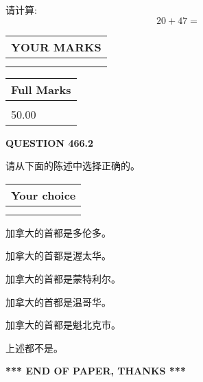 \documentclass{ctexart}
\begin{document}
  
 
请计算:
\begin{equation}
20 +  %
47 = \nonumber
\end{equation}
 

 

 
  
\vspace{0.2in}
  
\noindent\begin{tabular}{|l|}
\hline
 YOUR MARKS  \\
\hline
 \\ 
 \\ 
\hline
\end{tabular}
\hspace{0.05in} \begin{tabular}{|l|}
\hline
 Full Marks  \\
\hline
 \\ 
50.00 \\
\hline
\end{tabular}
{\textbf{\Large{QUESTION
466.2 
}}}
  
  
请从下面的陈述中选择正确的。
  
  
\noindent\hspace{3.0in} \begin{tabular}{|l|}
\hline
Your choice \\
\hline
 \\ 
 \\ 
\hline
\end{tabular}
  
  
 
 
加拿大的首都是多伦多。
 
 
加拿大的首都是渥太华。
 
 
加拿大的首都是蒙特利尔。
 
 
加拿大的首都是温哥华。
 
 
加拿大的首都是魁北克市。
 
 
 上述都不是。
 
 
   
   
 \vspace{0.2in}
 
   
   
   
   
\vspace{1.0in} 
{\textbf{\large{ *** END OF PAPER, THANKS *** }}} 
   
\end{document}
